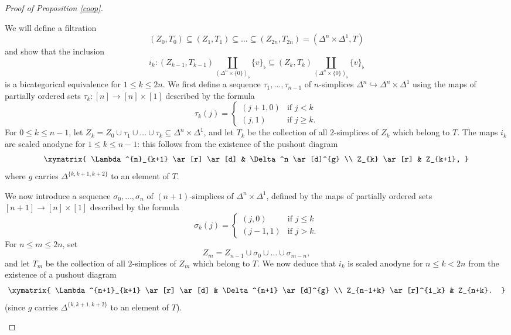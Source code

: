 \begin{proof}[Proof of Proposition \ref{coop}]
\begin{itemize}
We will define a filtration 
$$(Z_0,T_0) \subseteq (Z_1,T_1) \subseteq \ldots
\subseteq (Z_{2n}, T_{2n}) = (\Delta^n \times \Delta^1, T)$$
and show that the inclusion
$$i_k: (Z_{k-1}, T_{k-1}) \coprod_{ ( \Delta^n \times \{0\} )_{\flat} } \{v\}_{\flat}
\subseteq (Z_k, T_k) \coprod_{ ( \Delta^n \times \{0\} )_{\flat} } \{v\}_{\flat}$$
is a bicategorical equivalence for $1 \leq k \leq 2n$. We first define
a sequence $\tau_1, \ldots, \tau_{n-1}$ of $n$-simplices
$ \Delta^n \hookrightarrow \Delta^n \times \Delta^1$
using the maps of partially ordered sets
$\tau_{k}: [n] \rightarrow [n] \times [1]$ described by the formula
$$ \tau_{k}(j) = \begin{cases} (j+1,0) & \text{if } j < k \\
(j, 1) & \text{if } j \geq k. \end{cases}$$
For $0 \leq k \leq n-1$, let $Z_{k} = Z_0 \cup \tau_1 \cup \ldots \cup \tau_{ k} \subseteq \Delta^n \times \Delta^1$, and let $T_{k}$ be the collection of all $2$-simplices of $Z_k$ which belong to $T$.
The maps $i_{k}$ are scaled anodyne for $1 \leq k \leq n-1$: this follows from the existence of the pushout diagram
$$ \xymatrix{ \Lambda^{n}_{k+1} \ar[r] \ar[d] & \Delta^n \ar[d]^{g} \\
Z_{k} \ar[r] & Z_{k+1}, }$$
where $g$ carries $\Delta^{ \{k, k+1, k+2\} }$ to an element of $T$.

We now introduce a sequence $\sigma_0, \ldots, \sigma_n$ of $(n+1)$-simplices of
$\Delta^n \times \Delta^1$, defined by the maps of partially ordered sets $[n+1] \rightarrow [n] \times [1]$ described by the formula
$$ \sigma_{k}(j) = \begin{cases} (j,0) & \text{if } j \leq k \\
(j-1, 1) & \text{if } j > k. \end{cases}$$
For $n \leq m \leq 2n$, set 
$$Z_{m} = Z_{n-1} \cup \sigma_0 \cup \ldots \cup \sigma_{m-n},$$
and let $T_{m}$ be the collection of all $2$-simplices of $Z_{m}$ which belong to $T$.
We now deduce that $i_{k}$ is scaled anodyne for $n \leq k < 2n$ from the existence of a pushout diagram
$$ \xymatrix{ \Lambda^{n+1}_{k+1} \ar[r] \ar[d] & \Delta^{n+1} \ar[d]^{g} \\
Z_{n-1+k} \ar[r]^{i_k} & Z_{n+k}. }$$
(since $g$ carries $\Delta^{ \{k, k+1, k+2\} }$ to an element of $T$). 


\end{itemize}
\end{proof}
